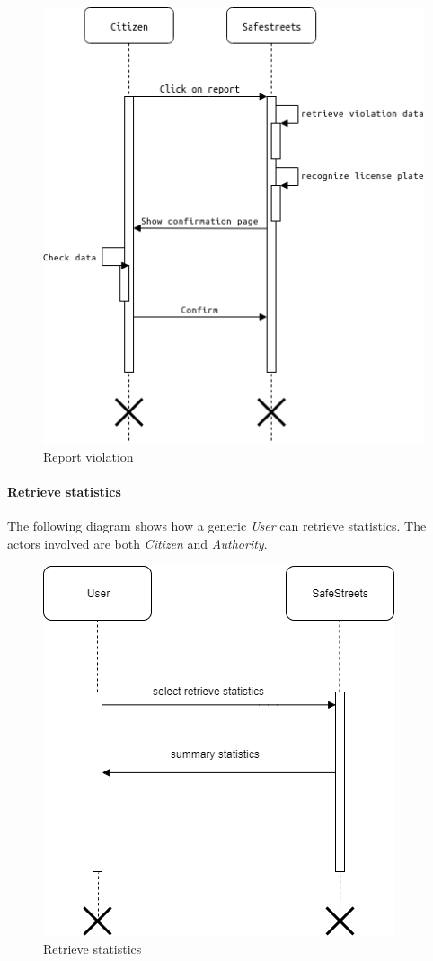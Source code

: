 \documentclass{article}
\begin{document}
\begin{figure}[H]
    \centering
    \includegraphics[scale=0.5]{img/sequence_diagrams/report_violation.png}
    \caption{Report violation}
\end{figure}

\clearpage

\paragraph{Retrieve statistics}
The following diagram shows how a generic \textit{User} can retrieve statistics. The actors involved
are both \textit{Citizen} and \textit{Authority}.  
\begin{figure}[H]
    \centering
    \includegraphics[scale=0.5]{img/sequence_diagrams/retrieve_statistics.png}
    \caption{Retrieve statistics}
\end{figure}
\end{document}
